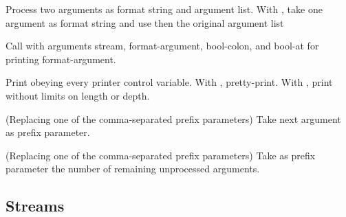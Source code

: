 \begin{LIST}{1cm}
\begin{LIST}{.5cm}
    {
    Process two arguments as format string and argument list. With
    , take one argument as format string and use then the
    original argument list
  }

    {
    Call  with arguments stream, format-argument,
    bool-colon, and bool-at for printing format-argument.
  }

    {
    Print obeying every printer control variable. With \kwd{:},
    pretty-print. With , print without limits on length or depth.
  }

    {
    (Replacing one of the comma-separated prefix parameters) Take next
    argument as prefix parameter.
  }

    \IT{\KWD{\#}}
    {
    (Replacing one of the comma-separated prefix parameters) Take as
    prefix parameter the number of remaining unprocessed arguments.
  }

  \end{LIST}

\end{LIST}


\subsection{Streams} 

